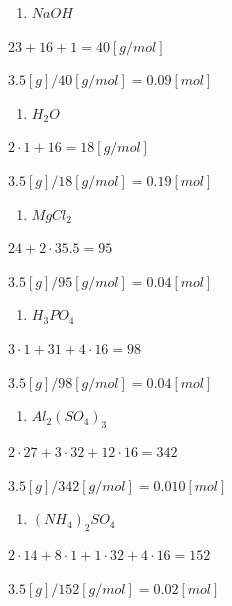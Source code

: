 \documentclass[
  11pt,
  a4paper,
  openany]{book}
\providecommand{\tightlist}{%
  \setlength{\itemsep}{0pt}\setlength{\parskip}{0pt}}
\begin{document}
\begin{Answer}

\begin{multicols}{2}

\begin{enumerate}
\def\labelenumi{\arabic{enumi}.}
\tightlist
\item
  \(NaOH\)
\end{enumerate}

\(23 + 16 + 1 = 40 [g/mol]\)

\(3.5 [g] / 40 [g/mol] = 0.09 [mol]\)

\begin{enumerate}
\def\labelenumi{\arabic{enumi}.}
\setcounter{enumi}{1}
\tightlist
\item
  \(H_2O\)
\end{enumerate}

\(2 \cdot 1 + 16  = 18 [g/mol]\)

\(3.5 [g] / 18 [g/mol] = 0.19 [mol]\)

\begin{enumerate}
\def\labelenumi{\arabic{enumi}.}
\setcounter{enumi}{2}
\tightlist
\item
  \(MgCl_2\)
\end{enumerate}

\(24 + 2 \cdot 35.5 = 95\)

\(3.5 [g] / 95 [g/mol] = 0.04 [mol]\)

\begin{enumerate}
\def\labelenumi{\arabic{enumi}.}
\setcounter{enumi}{3}
\tightlist
\item
  \(H_3PO_4\)
\end{enumerate}

\(3 \cdot 1 + 31 + 4 \cdot 16 = 98\)

\(3.5 [g] / 98 [g/mol] = 0.04 [mol]\)

\begin{enumerate}
\def\labelenumi{\arabic{enumi}.}
\setcounter{enumi}{4}
\tightlist
\item
  \(Al_2(SO_4)_3\)
\end{enumerate}

\(2 \cdot 27 + 3 \cdot 32 + 12 \cdot 16 = 342\)

\(3.5 [g] / 342 [g/mol] = 0.010 [mol]\)

\begin{enumerate}
\def\labelenumi{\arabic{enumi}.}
\setcounter{enumi}{5}
\tightlist
\item
  \((NH_4)_2SO_4\)
\end{enumerate}

\(2 \cdot 14 + 8 \cdot 1 + 1 \cdot 32 + 4 \cdot 16 = 152\)

\(3.5 [g] / 152 [g/mol] = 0.02 [mol]\)

\end{multicols}

\end{Answer}
\end{document}
